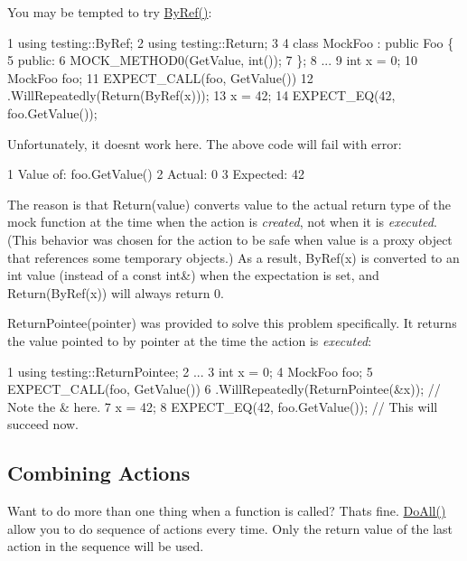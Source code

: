 You may be tempted to try {\ttfamily \hyperlink{namespacetesting_aaee6d42dcd69de6e7a1459c5c71222c3}{By\+Ref()}}\+:


\begin{DoxyCode}
1 using testing::ByRef;
2 using testing::Return;
3 
4 class MockFoo : public Foo \{
5  public:
6   MOCK\_METHOD0(GetValue, int());
7 \};
8 ...
9   int x = 0;
10   MockFoo foo;
11   EXPECT\_CALL(foo, GetValue())
12       .WillRepeatedly(Return(ByRef(x)));
13   x = 42;
14   EXPECT\_EQ(42, foo.GetValue());
\end{DoxyCode}


Unfortunately, it doesn\textquotesingle{}t work here. The above code will fail with error\+:


\begin{DoxyCode}
1 Value of: foo.GetValue()
2   Actual: 0
3 Expected: 42
\end{DoxyCode}


The reason is that {\ttfamily Return(value)} converts {\ttfamily value} to the actual return type of the mock function at the time when the action is {\itshape created}, not when it is {\itshape executed}. (This behavior was chosen for the action to be safe when {\ttfamily value} is a proxy object that references some temporary objects.) As a result, {\ttfamily By\+Ref(x)} is converted to an {\ttfamily int} value (instead of a {\ttfamily const int\&}) when the expectation is set, and {\ttfamily Return(\+By\+Ref(x))} will always return 0.

{\ttfamily Return\+Pointee(pointer)} was provided to solve this problem specifically. It returns the value pointed to by {\ttfamily pointer} at the time the action is {\itshape executed}\+:


\begin{DoxyCode}
1 using testing::ReturnPointee;
2 ...
3   int x = 0;
4   MockFoo foo;
5   EXPECT\_CALL(foo, GetValue())
6       .WillRepeatedly(ReturnPointee(&x));  // Note the & here.
7   x = 42;
8   EXPECT\_EQ(42, foo.GetValue());  // This will succeed now.
\end{DoxyCode}


\subsection*{Combining Actions}

Want to do more than one thing when a function is called? That\textquotesingle{}s fine. {\ttfamily \hyperlink{namespacetesting_a5f533932753d2af95000e96c4a3042e3}{Do\+All()}} allow you to do sequence of actions every time. Only the return value of the last action in the sequence will be used.



